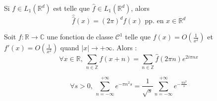 	\begin{theorem}
		Si $f \in L_1(\mathbb{R}^d)$ est telle que $\widehat{f} \in L_1(\mathbb{R}^d)$, alors
		\[ \widehat{\widehat{f}}(x) = (2\pi)^d f(x) \text{ pp. en } x \in \mathbb{R}^d \]
	\end{theorem}
	
	
	\begin{theorem}
		Soit $f : \mathbb{R} \rightarrow \mathbb{C}$ une fonction de classe $\mathcal{C}^1$ telle que $f(x) = O \left( \frac{1}{x^2} \right)$ et $f'(x) = O \left( \frac{1}{x^2} \right)$ quand $|x| \longrightarrow +\infty$. Alors :
		\[ \forall x \in \mathbb{R}, \, \sum_{n \in \mathbb{Z}} f(x+n) = \sum_{n \in \mathbb{Z}} \widehat{f}(2 \pi n) e^{2 i \pi n x} \]
	\end{theorem}
	
	\begin{application}
		\[ \forall s > 0, \, \sum_{n=-\infty}^{+\infty} e^{-\pi n^2 s} = \frac{1}{\sqrt{s}} \sum_{n=-\infty}^{+\infty} e^{-\frac{\pi n^2}{s}} \]
	\end{application}

